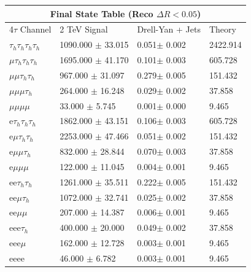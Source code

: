 \documentclass{article}
\begin{document}
 
\begin{landscape} 
\centering 
\begin{tabular}{|p{4.5cm}|p{3cm}|p{3cm}|p{3cm}|}\hline 
\multicolumn{4}{|c|}{Final State Table (Reco \(\Delta R < 0.05\))} \\ 
\hline 
4$\tau$ Channel & 2 TeV Signal & Drell-Yan + Jets & Theory \\ 
\hline 
$\tau_h$$\tau_h$$\tau_h$$\tau_h$ & 1090.000 $\pm$ 33.015 & 0.051$\pm$ 0.002 & 2422.914\\
\hline 
$\mu$$\tau_h$$\tau_h$$\tau_h$ & 1695.000 $\pm$ 41.170 & 0.101$\pm$ 0.003 & 605.728\\
\hline 
$\mu$$\mu$$\tau_h$$\tau_h$ & 967.000 $\pm$ 31.097 & 0.279$\pm$ 0.005 & 151.432\\
\hline 
$\mu$$\mu$$\mu$$\tau_h$ & 264.000 $\pm$ 16.248 & 0.029$\pm$ 0.002 & 37.858\\
\hline 
$\mu$$\mu$$\mu$$\mu$ & 33.000 $\pm$ 5.745 & 0.001$\pm$ 0.000 & 9.465\\
\hline 
e$\tau_h$$\tau_h$$\tau_h$ & 1862.000 $\pm$ 43.151 & 0.106$\pm$ 0.003 & 605.728\\
\hline 
e$\mu$$\tau_h$$\tau_h$ & 2253.000 $\pm$ 47.466 & 0.051$\pm$ 0.002 & 151.432\\
\hline 
e$\mu$$\mu$$\tau_h$ & 832.000 $\pm$ 28.844 & 0.070$\pm$ 0.003 & 37.858\\
\hline 
e$\mu$$\mu$$\mu$ & 122.000 $\pm$ 11.045 & 0.004$\pm$ 0.001 & 9.465\\
\hline 
ee$\tau_h$$\tau_h$ & 1261.000 $\pm$ 35.511 & 0.222$\pm$ 0.005 & 151.432\\
\hline 
ee$\mu$$\tau_h$ & 1072.000 $\pm$ 32.741 & 0.025$\pm$ 0.002 & 37.858\\
\hline 
ee$\mu$$\mu$ & 207.000 $\pm$ 14.387 & 0.006$\pm$ 0.001 & 9.465\\
\hline 
eee$\tau_h$ & 400.000 $\pm$ 20.000 & 0.049$\pm$ 0.002 & 37.858\\
\hline 
eee$\mu$ & 162.000 $\pm$ 12.728 & 0.003$\pm$ 0.001 & 9.465\\
\hline 
eeee & 46.000 $\pm$ 6.782 & 0.003$\pm$ 0.001 & 9.465\\
\hline 
\end{tabular} 
\end{landscape} 
\end{document}
